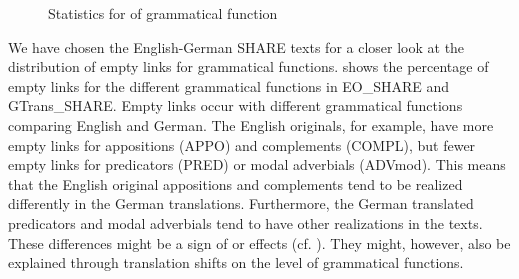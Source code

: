 \documentclass[output=paper]{LSP/langsci}
\begin{document}
\begin{figure}

\caption{Statistics for  of grammatical function}
\label{fig:culo:grammaticalfunction}
\end{figure}

We have chosen the English-German SHARE texts for a closer look at the distribution of empty links for grammatical functions.  shows the percentage of empty links for the different grammatical functions in EO\_SHARE and GTrans\_SHARE. Empty links occur with different grammatical functions comparing English and German. The English originals, for example, have more empty links for appositions (APPO) and complements (COMPL), but fewer empty links for predicators (PRED) or modal adverbials (ADVmod). This means that the English original appositions and complements tend to be realized differently in the German translations. Furthermore, the German translated predicators and modal adverbials tend to have other realizations in the  texts. These differences might be a sign of  or  effects (cf. 
\citealt{Hansen-SchirraEtAl2007}). They might, however, also be explained through translation shifts on the level of grammatical functions.
\end{document}
